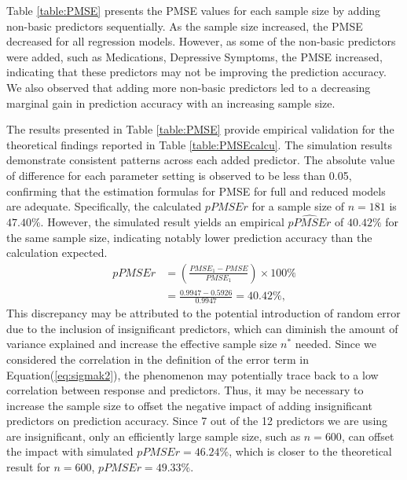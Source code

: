 Table \ref{table:PMSE} presents the PMSE values for each sample size by adding non-basic predictors sequentially. As the sample size increased, the PMSE decreased for all regression models. However, as some of the non-basic predictors were added, such as Medications, Depressive Symptoms, the PMSE increased, indicating that these predictors may not be improving the prediction accuracy. We also observed that adding more non-basic predictors led to a decreasing marginal gain in prediction accuracy with an increasing sample size.

The results presented in Table \ref{table:PMSE} provide empirical validation for the theoretical findings reported in Table \ref{table:PMSEcalcu}. The simulation results demonstrate consistent patterns across each added predictor. The absolute value of difference for each parameter setting is observed to be less than 0.05, confirming that the estimation formulas for PMSE for full and reduced models are adequate.
Specifically, the calculated $pPMSEr$ for a sample size of $n=181$ is $47.40\%$. However, the simulated result yields an empirical $\hat{pPMSEr}$ of $40.42\%$ for the same sample size, indicating notably lower prediction accuracy than the calculation expected. 
$$\begin{aligned}
pPMSEr &= \left(\frac{PMSE_1 - PMSE}{PMSE_1} \right)\times 100\%\\
&= \frac{0.9947-0.5926}{0.9947}= 40.42\%,
\end{aligned}$$  
This discrepancy may be attributed to the potential introduction of random error due to the inclusion of insignificant predictors, which can diminish the amount of variance explained and increase the effective sample size $n^*$ needed. Since we considered the correlation in the definition of the error term in Equation(\ref{eq:sigmak2}), the phenomenon may potentially trace back to a low correlation between response and predictors. Thus, it may be necessary to increase the sample size to offset the negative impact of adding insignificant predictors on prediction accuracy. Since 7 out of the 12 predictors we are using are insignificant, only an efficiently large sample size, such as $n=600$, can offset the impact with simulated $pPMSEr = 46.24\%$, which is closer to the theoretical result for $n = 600$, $pPMSEr = 49.33\%$.

